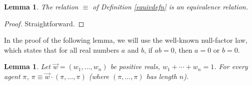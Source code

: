 \documentclass[twoside]{article}
\newtheorem{lemma}[theorem]{Lemma}
\begin{document}
\begin{lemma}
\label{equivrelationlemma}
    The relation $\equiv$ of Definition \ref{equivdefn} is an equivalence
    relation.
\end{lemma}

\begin{proof}
    Straightforward.
\end{proof}

In the proof of the following lemma, we will use the well-known null-factor
law, which states that for all real numbers $a$ and $b$, if $ab=0$,
then $a=0$ or $b=0$.

\begin{lemma}
\label{piopluspilemma}
    Let $\vec w=(w_1,\ldots,w_n)$ be positive reals,
    $w_1+\cdots+w_n=1$. For every agent $\pi$,
    $\pi\equiv\vec w\cdot (\pi,\ldots,\pi)$ (where
    $(\pi,\ldots,\pi)$ has length $n$).
\end{lemma}
\end{document}
